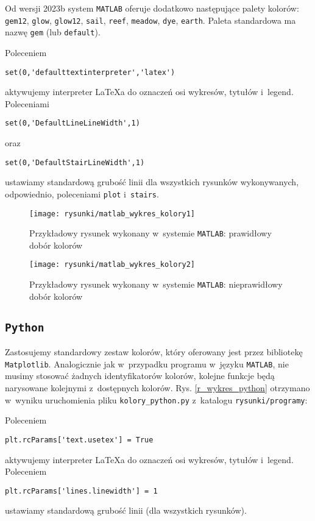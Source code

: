 Od wersji 2023b system \texttt{MATLAB} oferuje dodatkowo następujące palety kolorów: \verb+gem12+, \verb+glow+, \verb+glow12+, \verb+sail+, \verb+reef+, \verb+meadow+, \verb+dye+, \verb+earth+. Paleta standardowa ma nazwę \verb+gem+ (lub \verb+default+).

Poleceniem
\begin{lstlisting}[style=custommatlab,frame=single]
set(0,'defaulttextinterpreter','latex')
\end{lstlisting}
aktywujemy interpreter \LaTeX a do oznaczeń osi wykresów, tytułów i~legend. Poleceniami
\begin{lstlisting}[style=custommatlab,frame=single]
set(0,'DefaultLineLineWidth',1)
\end{lstlisting}
oraz
\begin{lstlisting}[style=custommatlab,frame=single]
set(0,'DefaultStairLineWidth',1)
\end{lstlisting}
ustawiamy standardową grubość linii dla wszystkich rysunków wykonywanych, odpowiednio, poleceniami \verb|plot| i~\verb|stairs|.

\begin{figure}[H]
\centering
\texttt{[image: rysunki/matlab\_wykres\_kolory1]}
\caption{Przykładowy rysunek wykonany w~systemie \texttt{MATLAB}: prawidłowy dobór kolorów}
\label{r_wykres_kolory1}
\end{figure}

\begin{figure}[H]
\centering
\texttt{[image: rysunki/matlab\_wykres\_kolory2]}
\caption{Przykładowy rysunek wykonany w~systemie \texttt{MATLAB}: nieprawidłowy dobór kolorów}
\label{r_wykres_kolory2}
\end{figure}

\subsection{\texttt{Python}}
Zastosujemy standardowy zestaw kolorów, który oferowany jest przez bibliotekę \verb+Matplotlib+. Analogicznie jak w~przypadku programu w~języku \texttt{MATLAB}, nie musimy stosować żadnych identyfikatorów kolorów, kolejne funkcje będą narysowane kolejnymi z~dostępnych kolorów. Rys. \ref{r_wykres_python} otrzymano w~wyniku uruchomienia pliku \verb+kolory_python.py+ z~katalogu \verb+rysunki/programy+:


Poleceniem
\begin{lstlisting}[style=custompython,frame=single]
plt.rcParams['text.usetex'] = True
\end{lstlisting}
aktywujemy interpreter \LaTeX a do oznaczeń osi wykresów, tytułów i~legend. Poleceniem
\begin{lstlisting}[style=custompython,frame=single]
plt.rcParams['lines.linewidth'] = 1
\end{lstlisting}
ustawiamy standardową grubość linii (dla wszystkich rysunków).

